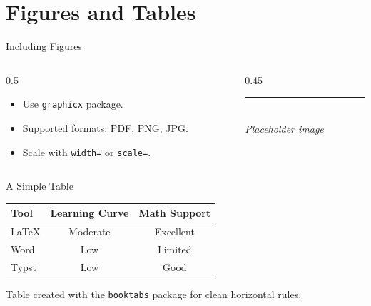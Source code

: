\documentclass[aspectratio=169]{beamer}
\begin{document}
\section{Figures and Tables}

\begin{frame}{Including Figures}
    \begin{columns}[T]
        \begin{column}{0.5\textwidth}
            \begin{itemize}
                \item Use \texttt{graphicx} package.
                \item Supported formats: PDF, PNG, JPG.
                \item Scale with \texttt{width=} or \texttt{scale=}.
            \end{itemize}
        \end{column}
        \begin{column}{0.45\textwidth}
            \centering
            \rule{\textwidth}{4cm}\\   %
            {\small\itshape Placeholder image}
        \end{column}
    \end{columns}
\end{frame}

\begin{frame}{A Simple Table}
    \centering
    \begin{tabular}{lcc}
        \toprule
        \textbf{Tool}     & \textbf{Learning Curve} & \textbf{Math Support} \\
        \midrule
        \LaTeX{}           & Moderate  & Excellent \\
        Word               & Low       & Limited   \\
        Typst              & Low       & Good      \\
        \bottomrule
    \end{tabular}

    \vspace{1em}
    Table created with the \texttt{booktabs} package for clean horizontal
    rules.
\end{frame}
\end{document}
